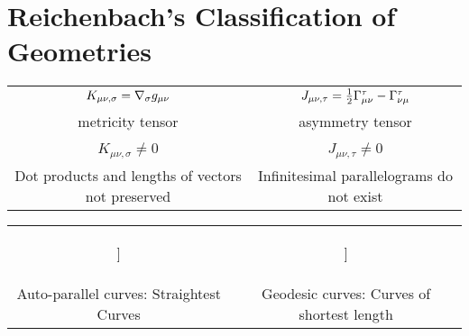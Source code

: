 \documentclass[final]{article}
\begin{document}
\appendix
\section{Reichenbach's Classification of Geometries}
\label{appendix}


\footnotesize
\begin{infobox}
\begin{center}
\begin{tabular}{cc}
 $K_{\mu \nu, \sigma} = \nabla_{\sigma} g_{\mu\nu}$ & $J_{\mu\nu,\tau}=\frac{1}{2} \Gamma^\tau_{\mu\nu}-\Gamma^\tau_{\nu\mu}$ \\
metricity tensor & asymmetry tensor \\ \\
 $K_{\mu \nu, \sigma} \neq 0$ & $J_{\mu\nu,\tau} \neq 0$ \\

Dot products and lengths of vectors not preserved & Infinitesimal parallelograms do not exist

 \end{tabular}
 \end{center}
\end{infobox}
\begin{infobox}
\begin{center}
\begin{tabular}{cc}
\begin{forest}
[{$\begin{array}{c}\text{Displacement Space} \\ K_{\mu \nu, \sigma} \neq 0 \end{array}$} [{$\begin{array}{c}\text{Weyl geometry} \\ \Gtmn=\Gtnm \end{array}$}] [{$\Gtmn\neq\Gtnm$}]]
\end{forest} 

&

\begin{forest}
[{$\begin{array}{c}\text{Metrical Space} \\ K_{\mu \nu, \sigma} = 0\end{array}$} [{$\begin{array}{c}\text{Riemann Geometry} \\ \Gtmn=\Gtnm \end{array}$}] [{$\begin{array}{c}\text{Reichenbach Geometry} \\ \Gtmn\neq\Gtnm \end{array}$}\hide{[{$\begin{array}{c}\text{Einstein Geometry} \\ \ritea=0 \end{array}$}]}]]
\end{forest} \\
Auto-parallel curves: Straightest Curves & Geodesic curves: Curves of shortest length 

\end{tabular}
\end{center}
\end{infobox}
\end{document}

